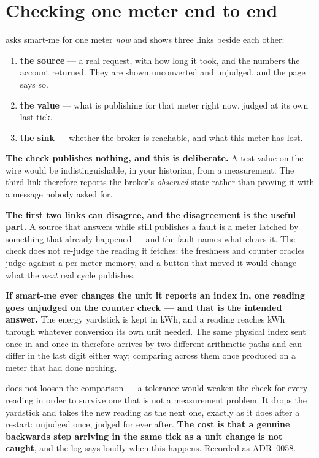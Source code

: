 \section{Checking one meter end to end}

 asks smart-me for one meter \emph{now} and shows three links beside each other:

\begin{enumerate}
  \item \textbf{the source} --- a real request, with how long it took, and the numbers the
        account returned. They are shown unconverted and unjudged, and the page says so.
  \item \textbf{the value} --- what \prog is publishing for that meter right now, judged at
        its own last tick.
  \item \textbf{the sink} --- whether the broker is reachable, and what this meter has lost.
\end{enumerate}

\begin{warning}
\textbf{The check publishes nothing, and this is deliberate.} A test value on the wire would be
indistinguishable, in your historian, from a measurement. The third link therefore reports the
broker's \emph{observed} state rather than proving it with a message nobody asked for.
\end{warning}

\begin{note}
\textbf{The first two links can disagree, and the disagreement is the useful part.} A source
that answers while \prog still publishes a fault is a meter latched by something that already
happened --- and the fault names what clears it. The check does not re-judge the reading it
fetches: the freshness and counter oracles judge against a per-meter memory, and a button that
moved it would change what the \emph{next} real cycle publishes.
\end{note}

\begin{note}
\textbf{If smart-me ever changes the unit it reports an index in, one reading goes unjudged on
the counter check --- and that is the intended answer.} The energy yardstick is kept in kWh, and a
reading reaches kWh through whatever conversion its own unit needed. The same physical index sent
once in  and once in  therefore arrives by two different arithmetic paths and
can differ in the last digit either way; comparing across them once produced
 on a meter that had done nothing.

\prog does not loosen the comparison --- a tolerance would weaken the check for every reading in
order to survive one that is not a measurement problem. It drops the yardstick and takes the new
reading as the next one, exactly as it does after a restart: unjudged once, judged for ever after.
\textbf{The cost is that a genuine backwards step arriving in the same tick as a unit change is not
caught}, and the log says loudly when this happens. Recorded as ADR~0058.
\end{note}

